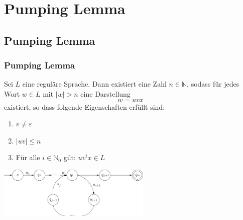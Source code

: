 


\section{Pumping Lemma}
\subsection{Pumping Lemma}
\begin{frame}
	\frametitle{Pumping Lemma}
	
Sei $L$ eine reguläre Sprache. Dann existiert eine Zahl $n \in \mathbb{N}$, sodass für jedes Wort $w \in L$ mit $\left|w \right| > n$ eine Darstellung $$w = uvx$$ existiert, so dass folgende Eigenschaften erfüllt sind:

\begin{enumerate}
\item $v \neq \varepsilon$ 
\item $\left|uv\right| \leq n$ 
\item Für alle $i \in \mathbb{N}_0$ gilt: $uv^ix \in L$
\end{enumerate}

\begin{center}
\includegraphics[width=0.55\textwidth]{images/Q116}
\end{center}

\end{frame}

